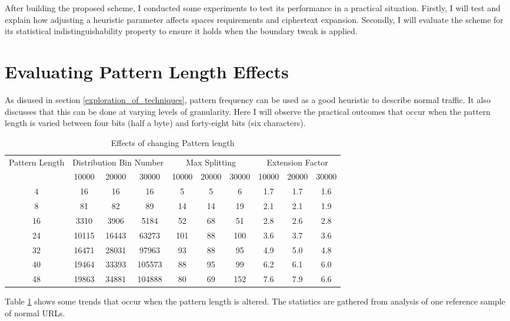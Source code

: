 \documentclass[ %
                    author={Samuel Russell},
                supervisor={Prof. Bogdan Warinschi},
                    degree={MEng},
                     title={Innocuous Ciphertexts},
                  subtitle={The DE-CENSOR Scheme},
                      type={research},
                      year={2018} ]{dissertation}
\begin{document}
After building the proposed scheme, I conducted some experiments to test its performance in a practical situation.
Firstly, I will test and explain how adjusting a heuristic parameter affects spaces requirements and ciphertext expansion.
Secondly, I will evaluate the scheme for its statistical indistinguishability property to ensure it holds when the boundary tweak is applied.

\section{Evaluating Pattern Length Effects}\label{sec:gran}

As disused in section \ref{exploration_of_techniques}, pattern frequency can be used as a good heuristic to describe normal traffic.
It also discusses that this can be done at varying levels of granularity.
Here I will observe the practical outcomes that occur when the pattern length is varied between four bits (half a byte) and forty-eight bits (six characters).

\begin{table}[h]
\centering
\begin{tabular}{|c|c|c|c|c|c|c|c|c|c|}
\hline
\multirow{2}{*}{Pattern Length}&
\multicolumn{3}{|c|}{Distribution Bin Number}&
\multicolumn{3}{|c|}{Max Splitting}&
\multicolumn{3}{|c|}{Extension Factor}\\
\cline{2-10}
&10000&20000&30000&10000&20000&30000&10000&20000&30000\\
\hline
4 	& 16&16&16 				& 5&5&6 		& 1.7&1.7&1.6\\
8 	& 81&82&89 				& 14&14&19		& 2.1&2.1&1.9\\
16 	& 3310&3906&5184 		& 52&68&51 		& 2.8&2.6&2.8\\
24 	& 10115&16443&63273 	& 101&88&100 	& 3.6&3.7&3.6\\
32 	& 16471&28031&97963 	& 93&88&95 		& 4.9&5.0&4.8\\
40 	& 19464&33393&105573 	& 88&95&99 		& 6.2&6.1&6.0\\
48 	& 19863&34881&104888 	& 80&69&152 	& 7.6&7.9&6.6\\
\hline
\end{tabular}
\caption{Effects of changing Pattern length}
\label{tab:patlen}
\end{table}

Table \ref{tab:patlen} shows some trends that occur when the pattern length is altered. The statistics are gathered from analysis of one reference sample of normal URLs.
\end{document}
